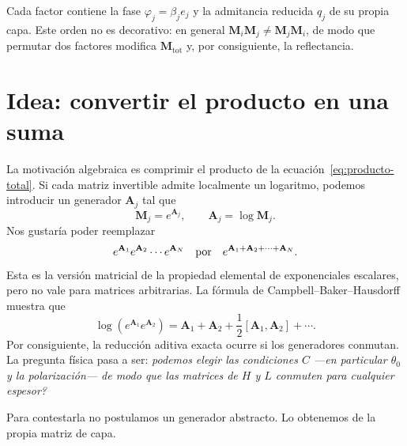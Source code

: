 \documentclass[10pt,a4paper]{article}
\newcommand{\M}{\mathbf{M}}
\newcommand{\comm}[2]{\left[#1,#2\right]}
\begin{document}
Cada factor contiene la fase $\varphi_j=\beta_j e_j$ y la admitancia reducida
$q_j$ de su propia capa. Este orden no es decorativo: en general
$\M_i\M_j\neq\M_j\M_i$, de modo que permutar dos factores modifica
$\M_{\mathrm{tot}}$ y, por consiguiente, la reflectancia.

\section{Idea: convertir el producto en una suma}

La motivaci\'on algebraica es comprimir el producto de la ecuaci\'on~\eqref{eq:producto-total}. Si cada matriz invertible admite localmente un logaritmo, podemos introducir un generador $\mathbf{A}_j$ tal que
\begin{equation}
\M_j=e^{\mathbf{A}_j},
\qquad
\mathbf{A}_j=\log\M_j.
\label{eq:log-general}
\end{equation}
Nos gustar\'ia poder reemplazar
\begin{equation}
e^{\mathbf{A}_1}e^{\mathbf{A}_2}\cdots e^{\mathbf{A}_N}
\quad\hbox{por}\quad
e^{\mathbf{A}_1+\mathbf{A}_2+\cdots+\mathbf{A}_N}.
\label{eq:deseo-aditivo}
\end{equation}
Esta es la versi\'on matricial de la propiedad elemental de exponenciales escalares, pero no vale para matrices arbitrarias. La f\'ormula de Campbell--Baker--Hausdorff muestra que
\begin{equation}
\log\!\left(e^{\mathbf{A}_1}e^{\mathbf{A}_2}\right)
=\mathbf{A}_1+\mathbf{A}_2+\frac{1}{2}\comm{\mathbf{A}_1}{\mathbf{A}_2}+\cdots.
\label{eq:bch-motivacion}
\end{equation}
Por consiguiente, la reducci\'on aditiva exacta ocurre si los generadores conmutan. La pregunta f\'isica pasa a ser: \emph{\textquestiondown podemos elegir las condiciones $C$ ---en particular $\theta_0$ y la polarizaci\'on--- de modo que las matrices de $H$ y $L$ conmuten para cualquier espesor?}

Para contestarla no postulamos un generador abstracto. Lo obtenemos de la propia matriz de capa.
\end{document}
